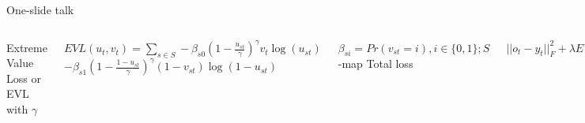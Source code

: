 \documentclass{beamer}
\begin{document}
\begin{frame}{One-slide talk}
\begin{columns}[c]
\end{columns}
\bigskip
\begin{columns}[c]
\qquad Extreme Value Loss or EVL with $\gamma$
\bigskip


 $\textit{EVL}(u_t,v_t) =\sum\limits_{s\in S} -\beta_{s0} \left( 1 - \frac{u_{st}}{\gamma}\right)^\gamma v_t\log(u_{st}) $  
 $ -\beta_{s1} \left( 1 - \frac{1 - u_{st}}{\gamma}\right)^\gamma (1-v_{st})\log(1 - u_{st}) $ 


\bigskip
\qquad $\beta_{si} = Pr(v_{st} = i ),  i \in \{0,1\}; S$ -map
Total loss

$  ||o_t - y_t||^2_F +  \lambda \textit{EVL}(u_t, v_t)$

\bigskip
$o_t$ - predicted feature map $u_t$ - predicted class map 
\qquad $\lambda$ - hyperparameter

\end{columns}
\end{frame}


\end{document}
